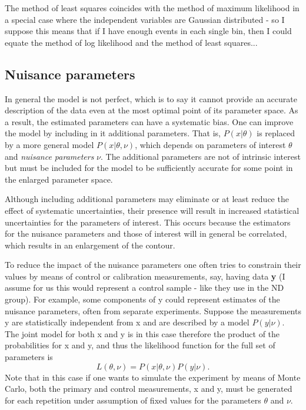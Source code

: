 The method of least squares coincides with the method of maximum likelihood in a special case where the independent variables are Gaussian distributed - so I suppose this means that if I have enough events in each single bin, then I could equate the method of log likelihood and the method of least squares...

\subsection{Nuisance parameters}
In general the model is not perfect, which is to say it cannot provide an accurate description of the data even at the most optimal point of its parameter space. As a result, the estimated parameters can have a systematic bias. One can improve the model by including in it additional parameters. That is, $P\left(x|\theta\right)$ is replaced by a more general model $P\left(x|\theta,\nu\right)$, which depends on parameters of interest $\theta$ and \textit{nuisance parameters} $\nu$. The additional parameters are not of intrinsic interest but must be included for the model to be sufficiently accurate for some point in the enlarged parameter space.

Although including additional parameters may eliminate or at least reduce the effect of systematic uncertainties, their presence will result in increased statistical uncertainties for the parameters of interest. This occurs because the estimators for the nuisance parameters and those of interest will in general be correlated, which results in an enlargement of the contour.

To reduce the impact of the nuisance parameters one often tries to constrain their values by means of control or calibration measurements, say, having data \textbf{y} (I assume for us this would represent a control sample - like they use in the ND group). For example, some components of y could represent estimates of the nuisance parameters, often from separate experiments. Suppose the measurements y are statistically independent from x and are described by a model $P\left(y|\nu\right)$. The joint model for both x and y is in this case therefore the product of the probabilities for x
and y, and thus the likelihood function for the full set of parameters is
\begin{equation}
L\left(\theta,\nu\right)=P\left(x|\theta,\nu\right)P\left(y|\nu\right).
\end{equation}
Note that in this case if one wants to simulate the experiment by means of Monte Carlo, both the primary and control measurements, x and y, must be generated for each repetition under assumption of fixed values for the parameters $\theta$ and $\nu$.

